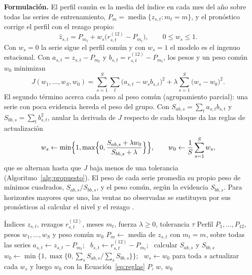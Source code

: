 \documentclass[pdflatex,sn-mathphys-num]{sn-jnl}
\theoremstyle{thmstyleone}
\begin{document}
\textbf{Formulación.} El perfil común es la media del índice en cada mes del año sobre todas las series de entrenamiento, $P_m=\operatorname{media}\{z_{s,t}:m_t=m\}$, y el pronóstico corrige el perfil con el rezago propio:
\begin{equation}
\hat{z}_{s,t}=P_{m_t}+w_s\bigl(r^{(12)}_{s,t}-P_{m_t}\bigr),\qquad 0\le w_s\le 1.
\label{eq:peg}
\end{equation}
Con $w_s=0$ la serie sigue el perfil común y con $w_s=1$ el modelo es el ingenuo estacional. Con $a_{s,t}=z_{s,t}-P_{m_t}$ y $b_{s,t}=r^{(12)}_{s,t}-P_{m_t}$, los pesos y un peso común $w_0$ minimizan
\begin{equation}
J(w_1,\dots,w_S,w_0)=\sum_{s=1}^{S}\sum_{t}\bigl(a_{s,t}-w_s b_{s,t}\bigr)^2+\lambda\sum_{s=1}^{S}\bigl(w_s-w_0\bigr)^2.
\label{eq:objetivo}
\end{equation}
El segundo término acerca cada peso al peso común (agrupamiento parcial): una serie con poca evidencia hereda el peso del grupo. Con $S_{ab,s}=\sum_t a_{s,t}b_{s,t}$ y $S_{bb,s}=\sum_t b_{s,t}^2$, anular la derivada de $J$ respecto de cada bloque da las reglas de actualización
\begin{equation}
w_s\leftarrow\min\Bigl\{1,\max\Bigl\{0,\frac{S_{ab,s}+\lambda w_0}{S_{bb,s}+\lambda}\Bigr\}\Bigr\},\qquad w_0\leftarrow\frac{1}{S}\sum_{s=1}^{S}w_s,
\label{eq:reglas}
\end{equation}
que se alternan hasta que $J$ baja menos de una tolerancia (Algoritmo~\ref{alg:propuesto}). El peso de cada serie promedia su propio peso de mínimos cuadrados, $S_{ab,s}/S_{bb,s}$, y el peso común, según la evidencia $S_{bb,s}$. Para horizontes mayores que uno, las ventas no observadas se sustituyen por sus pronósticos al calcular el nivel y el rezago \cite{taieb2012}.

\begin{algorithm}
\caption{Perfil estacional con pesos jerárquicos}\label{alg:propuesto}
\begin{algorithmic}[1]
\Require Índices $z_{s,t}$, rezagos $r^{(12)}_{s,t}$, meses $m_t$, fuerza $\lambda\ge0$, tolerancia $\tau$
\Ensure Perfil $P_1,\dots,P_{12}$, pesos $w_1,\dots,w_S$ y peso común $w_0$
\State $P_m\gets$ media de $z_{s,t}$ con $m_t=m$, sobre todas las series
\State $a_{s,t}\gets z_{s,t}-P_{m_t}$; \ $b_{s,t}\gets r^{(12)}_{s,t}-P_{m_t}$; \ calcular $S_{ab,s}$ y $S_{bb,s}$
\State $w_0\gets\min\{1,\max\{0,\sum_sS_{ab,s}/\sum_sS_{bb,s}\}\}$; \ $w_s\gets w_0$ para toda $s$
\Repeat
    \State actualizar cada $w_s$ y luego $w_0$ con la Ecuación~\eqref{eq:reglas}
\State \Return $P$, $w$, $w_0$ 
\end{algorithmic}
\end{algorithm}
\end{document}
